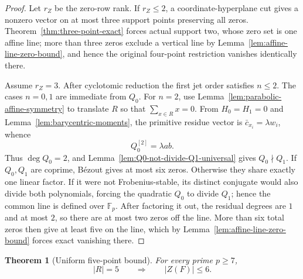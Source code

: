 \documentclass[11pt]{article}
\newtheorem{theorem}{Theorem}[section]
\newcommand{\F}{\mathbb F}
\begin{document}
\begin{proof}
Let $r_Z$ be the zero-row rank.  If $r_Z\le2$, a coordinate-hyperplane cut gives a nonzero vector on at most three support points preserving all zeros.  Theorem~\ref{thm:three-point-exact} forces actual support two, whose zero set is one affine line; more than three zeros exclude a vertical line by Lemma~\ref{lem:affine-line-zero-bound}, and hence the original four-point restriction vanishes identically there.

Assume $r_Z=3$.  After cyclotomic reduction the first jet order satisfies $n\le2$.  The cases $n=0,1$ are immediate from $Q_0$.  For $n=2$, use Lemma~\ref{lem:parabolic-affine-symmetry} to translate $R$ so that $\sum_{x\in R}x=0$.  From $H_0=H_1=0$ and Lemma~\ref{lem:barycentric-moments}, the primitive residue vector is $\bar c_{x_i}=\lambda w_i$, whence
\[
 Q_0^{[2]}=\lambda ab.
\]
Thus $\deg Q_0=2$, and Lemma~\ref{lem:Q0-not-divide-Q1-universal} gives $Q_0\nmid Q_1$.  If $Q_0,Q_1$ are coprime, B\'ezout gives at most six zeros.  Otherwise they share exactly one linear factor.  If it were not Frobenius-stable, its distinct conjugate would also divide both polynomials, forcing the quadratic $Q_0$ to divide $Q_1$; hence the common line is defined over $\F_p$.  After factoring it out, the residual degrees are $1$ and at most $2$, so there are at most two zeros off the line.  More than six total zeros then give at least five on the line, which by Lemma~\ref{lem:affine-line-zero-bound} forces exact vanishing there.
\end{proof}

\begin{theorem}[Uniform five-point bound]
\label{thm:five-point-six-zero}
For every prime $p\ge7$,
\begin{equation}
 |R|=5\qquad\Longrightarrow\qquad\boxed{|Z(F)|\le6.}
 \label{eq:five-point-six}
\end{equation}
\end{theorem}
\end{document}
